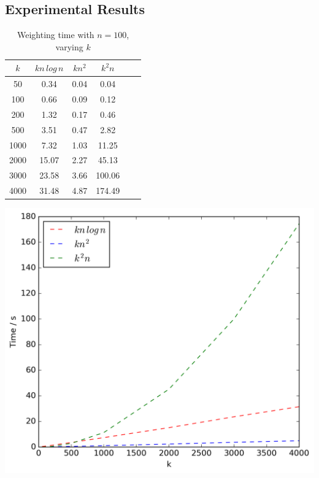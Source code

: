 \documentclass{article}
\begin{document}
    \subsection{Experimental Results}
    \label{subsec:results}

    \begin{table}[!ht]
        \captionsetup{font=footnotesize,justification=justified,margin=0cm}
        \small
        \begin{minipage}{0.48\textwidth}
            \centering
            \caption{Weighting time with $n = 100$, varying $k$}
            \label{tab:weightk1}
            \begin{tabular}{c||ccccc}
                $k$ & $kn\,log\,n$ & $kn^2$ & $k^2n$\\
                \hline\hline
                50 & 0.34 & 0.04 & 0.04\\
                100 & 0.66 & 0.09 & 0.12\\
                200 & 1.32 & 0.17 & 0.46\\
                500 & 3.51 & 0.47 & 2.82\\
                1000 & 7.32 & 1.03 & 11.25\\
                2000 & 15.07 & 2.27 & 45.13\\
                3000 & 23.58 & 3.66 & 100.06\\
                4000 & 31.48 & 4.87 & 174.49\\
            \end{tabular}
            \includegraphics[scale=0.4]{varyingk1_weighting}

\end{minipage}
\end{table}
\end{document}
